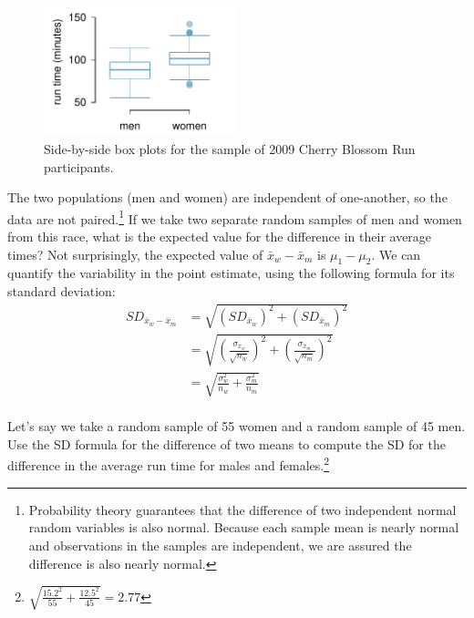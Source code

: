 \begin{figure}[h]
\centering
\includegraphics[width=0.5\textwidth]{ch_inference_for_means/figures/cbrRunTimesMenWomen/cbrRunTimesMenWomen}
\caption{Side-by-side box plots for the sample of 2009 Cherry Blossom Run participants.}
\label{cbrRunTimesMenWomen}
\end{figure}

The two populations (men and women) are independent of one-another, so the data are not paired.\footnote{Probability theory guarantees that the difference of two independent normal random variables is also normal. Because each sample mean is nearly normal and observations in the samples are independent, we are assured the difference is also nearly normal.} If we take two separate random samples of men and women from this race, what is the expected value for the difference in their average times? Not surprisingly, the expected value of $\bar{x}_{w} - \bar{x}_{m}$ is $\mu_1-\mu_2$. We can quantify the variability in the point estimate, using the following formula for its standard deviation:
\begin{align*}
SD_{\bar{x}_{w} - \bar{x}_{m}}
    &= \sqrt{\left(SD_{\bar{x}_{w}}\right)^2 +\left(SD_{\bar{x}_{m}}\right)^2 } \\
    &= \sqrt{\left(\frac{\sigma_{\bar{x}_{w}}}{\sqrt{n_w}}\right)^2 + \left(\frac{\sigma_{\bar{x}_{m}}}{\sqrt{n_m}}\right)^2 } \\
	&= \sqrt{\frac{\sigma_{w}^2}{n_{w}} + \frac{\sigma_{m}^2}{n_{m}}} \\
\end{align*}
\begin{exercise}
Let's say we take a random sample of 55 women and a random sample of 45 men. Use the SD formula for the difference of two means to compute the SD for the difference in the average run time for males and females.\footnote{$\sqrt{\frac{15.2^2}{55} + \frac{12.5^2}{45}} = 2.77$}
\end{exercise}


